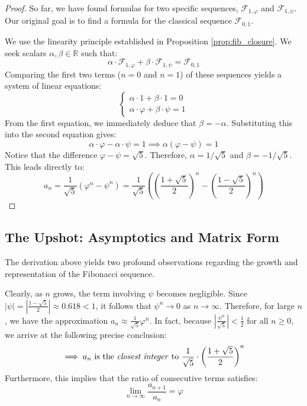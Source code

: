 \begin{proof}
So far, we have found formulas for two specific sequences, $\mathcal{F}_{1, \varphi}$ and $\mathcal{F}_{1, \psi}$. Our original goal is to find a formula for the classical sequence $\mathcal{F}_{0,1}$. 

We use the linearity principle established in Proposition \ref{prop:fib_closure}. We seek scalars $\alpha, \beta \in \mathbb{R}$ such that:
\[
\alpha \cdot \mathcal{F}_{1, \varphi} + \beta \cdot \mathcal{F}_{1, \psi} = \mathcal{F}_{0,1}
\]
Comparing the first two terms ($n=0$ and $n=1$) of these sequences yields a system of linear equations:
\begin{equation}
\begin{cases}
\alpha \cdot 1 + \beta \cdot 1 = 0 \\
\alpha \cdot \varphi + \beta \cdot \psi = 1
\end{cases}
\end{equation}
From the first equation, we immediately deduce that $\beta = -\alpha$. Substituting this into the second equation gives:
\[
\alpha \cdot \varphi - \alpha \cdot \psi = 1 \implies \alpha (\varphi - \psi) = 1
\]
Notice that the difference $\varphi - \psi = \sqrt{5}$. Therefore, $\alpha = 1/\sqrt{5}$ and $\beta = -1/\sqrt{5}$. This leads directly to:
\[
a_n = \frac{1}{\sqrt{5}} (\varphi^n - \psi^n) = \frac{1}{\sqrt{5}} \left( \left(\frac{1+\sqrt{5}}{2}\right)^n - \left(\frac{1-\sqrt{5}}{2}\right)^n \right)
\]
\end{proof}

\subsection{The Upshot: Asymptotics and Matrix Form}

The derivation above yields two profound observations regarding the growth and representation of the Fibonacci sequence.

\begin{importantremark}
Clearly, as $n$ grows, the term involving $\psi$ becomes negligible. Since $|\psi| = |\frac{1-\sqrt{5}}{2}| \approx 0.618 < 1$, it follows that $\psi^n \to 0$ as $n \to \infty$. Therefore, for large $n$, we have the approximation $a_n \approx \frac{1}{\sqrt{5}} \varphi^n$. In fact, because $\left| \frac{\psi^n}{\sqrt{5}} \right| < \frac{1}{2}$ for all $n \ge 0$, we arrive at the following precise conclusion:
\[
\implies a_n \text{ is the \textit{closest integer} to } \frac{1}{\sqrt{5}} \cdot \left(\frac{1+\sqrt{5}}{2}\right)^n
\]
Furthermore, this implies that the ratio of consecutive terms satisfies:
\begin{equation}
\lim_{n \to \infty} \frac{a_{n+1}}{a_n} = \varphi
\end{equation}
\end{importantremark}

